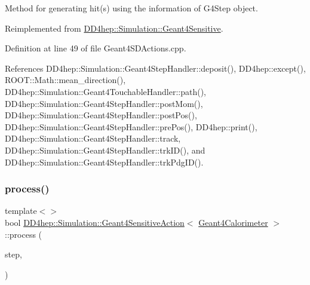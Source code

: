 Method for generating hit(s) using the information of G4\+Step object. 



Reimplemented from \hyperlink{class_d_d4hep_1_1_simulation_1_1_geant4_sensitive_a9a9463a6c29a66dad43a52ffc9f7838d}{D\+D4hep\+::\+Simulation\+::\+Geant4\+Sensitive}.



Definition at line 49 of file Geant4\+S\+D\+Actions.\+cpp.



References D\+D4hep\+::\+Simulation\+::\+Geant4\+Step\+Handler\+::deposit(), D\+D4hep\+::except(), R\+O\+O\+T\+::\+Math\+::mean\+\_\+direction(), D\+D4hep\+::\+Simulation\+::\+Geant4\+Touchable\+Handler\+::path(), D\+D4hep\+::\+Simulation\+::\+Geant4\+Step\+Handler\+::post\+Mom(), D\+D4hep\+::\+Simulation\+::\+Geant4\+Step\+Handler\+::post\+Pos(), D\+D4hep\+::\+Simulation\+::\+Geant4\+Step\+Handler\+::pre\+Pos(), D\+D4hep\+::print(), D\+D4hep\+::\+Simulation\+::\+Geant4\+Step\+Handler\+::track, D\+D4hep\+::\+Simulation\+::\+Geant4\+Step\+Handler\+::trk\+I\+D(), and D\+D4hep\+::\+Simulation\+::\+Geant4\+Step\+Handler\+::trk\+Pdg\+I\+D().

\hypertarget{class_d_d4hep_1_1_simulation_1_1_geant4_sensitive_action_ae88bc077d1d117f45a9952e2ca25e64f}{}\label{class_d_d4hep_1_1_simulation_1_1_geant4_sensitive_action_ae88bc077d1d117f45a9952e2ca25e64f} 
\subsubsection{\texorpdfstring{process()}{process()}\hspace{0.1cm}{\footnotesize\ttfamily [2/7]}}
{\footnotesize\ttfamily template$<$$>$ \\
bool \hyperlink{class_d_d4hep_1_1_simulation_1_1_geant4_sensitive_action}{D\+D4hep\+::\+Simulation\+::\+Geant4\+Sensitive\+Action}$<$ \hyperlink{class_d_d4hep_1_1_simulation_1_1_geant4_calorimeter}{Geant4\+Calorimeter} $>$\+::process (\begin{DoxyParamCaption}\item[{G4\+Step $\ast$}]{step,  }\item[{G4\+Touchable\+History $\ast$}]{ }\end{DoxyParamCaption})\hspace{0.3cm}{\ttfamily [virtual]}}



